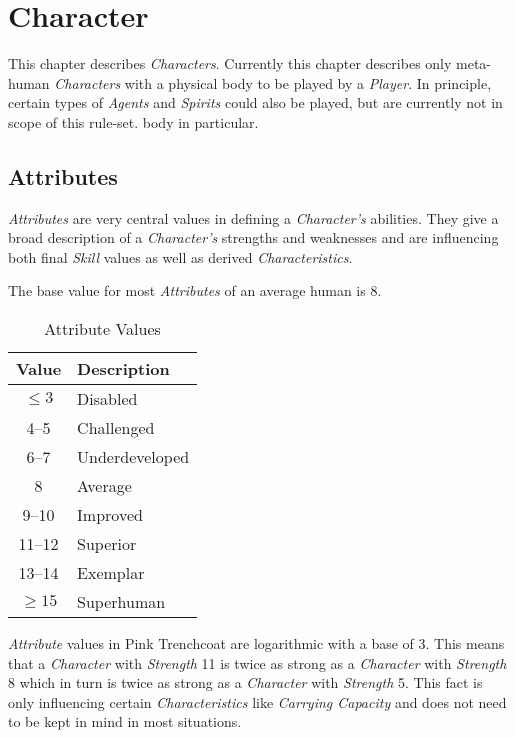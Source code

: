\chapter{Character}

This chapter describes \emph{Characters}. Currently this chapter describes only
meta-human \emph{Characters} with a physical body to be played by a \emph{Player}.
In principle, certain types of \emph{Agents} and \emph{Spirits} could also be played,
but are currently not in scope of this rule-set.
body in particular.

\section{Attributes}

\emph{Attributes} are very central values in defining a \emph{Character's}
abilities. They give a broad description of a \emph{Character's} strengths and
weaknesses and are influencing both final \emph{Skill} values as well as derived
\emph{Characteristics}.

The base value for most \emph{Attributes} of an average human is 8.

\begin{table}[htb]
    \caption[Attribute Values]{Attribute Values}
    \label{tab:attribute values}
    \centering
    \begin{tabular}{cl}
        \toprule
        \textbf{Value} & \textbf{Description} \\
        \midrule
        \( \le 3 \)    & Disabled             \\
        4--5           & Challenged           \\
        6--7           & Underdeveloped       \\
        8              & Average              \\
        9--10          & Improved             \\
        11--12         & Superior             \\
        13--14         & Exemplar             \\
        \( \ge 15 \)   & Superhuman           \\
        \bottomrule
    \end{tabular}
\end{table}

\emph{Attribute} values in Pink Trenchcoat are logarithmic with a base of 3.
This means that a \emph{Character} with \emph{Strength} 11 is twice as strong as a
\emph{Character} with \emph{Strength} 8 which in turn is twice as strong as a
\emph{Character} with \emph{Strength} 5.
This fact is only influencing certain \emph{Characteristics} like
\emph{Carrying Capacity} and does not need to be kept in mind in most situations.


